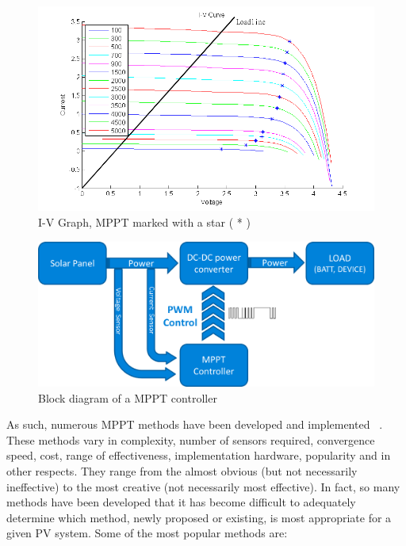 \begin{figure}[H]
   \begin{center}
     \includegraphics[width=\textwidth]{images/IV_lux_MPP}
     \caption{I-V Graph, MPPT marked with a star ( * )}
     \label{fig:IV_mppgraph}
    \end{center}
  \end{figure}
  
  \begin{figure}[H]
     \begin{center}
       \includegraphics[width=\textwidth]{images/mppt_coup}
       \caption{Block diagram of a MPPT controller}
       \label{fig:mppt_coup}
      \end{center}
    \end{figure}

As such, numerous \ac{MPPT} methods have been developed and implemented ~\cite{dondi2008modeling}\cite{eltawil2013mppt}\cite{ngan2011study}\cite{reza2013classification}. These methods vary in complexity, number of sensors required, convergence speed, cost, range of effectiveness, implementation hardware, popularity and in other respects. They range from the almost obvious (but not necessarily ineffective) to the most creative (not necessarily most effective)\cite{esram2007comparison}. In fact, so many methods have been developed that it has become difficult to adequately determine which method, newly proposed or existing, is most appropriate for a given PV system. Some of the most popular methods are: \\

